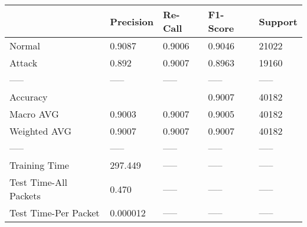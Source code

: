 \begin{tabular}{lllll}
\toprule
{} & Precision & Re-Call & F1-Score & Support \\
\midrule
Normal                &    0.9087 &  0.9006 &   0.9046 &   21022 \\
Attack                &     0.892 &  0.9007 &   0.8963 &   19160 \\
-----                 &     ----- &   ----- &    ----- &   ----- \\
Accuracy              &           &         &   0.9007 &   40182 \\
Macro AVG             &    0.9003 &  0.9007 &   0.9005 &   40182 \\
Weighted AVG          &    0.9007 &  0.9007 &   0.9007 &   40182 \\
-----                 &     ----- &   ----- &    ----- &   ----- \\
Training Time         &   297.449 &   ----- &    ----- &   ----- \\
Test Time-All Packets &     0.470 &   ----- &    ----- &   ----- \\
Test Time-Per Packet  &  0.000012 &   ----- &    ----- &   ----- \\
\bottomrule
\end{tabular}
